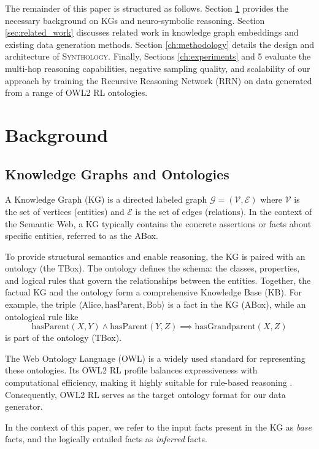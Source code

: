 \documentclass{IOS-Book-Article}     %
\newcommand{\gen}[1]{\langle #1 \rangle}
\begin{document}
The remainder of this paper is structured as follows. Section \ref{sec:background} provides the necessary background on KGs and neuro-symbolic reasoning. Section \ref{sec:related_work} discusses related work in knowledge graph embeddings and existing data generation methods. Section \ref{ch:methodology} details the design and architecture of \textsc{Synthology}. Finally, Sections \ref{ch:experiments} and 5 evaluate the multi-hop reasoning capabilities, negative sampling quality, and scalability of our approach by training the Recursive Reasoning Network (RRN) \cite{hohenecker2020ontology} on data generated from a range of OWL2 RL ontologies.

\section{Background}
\label{sec:background}

\subsection{Knowledge Graphs and Ontologies}
A Knowledge Graph (KG) is a directed labeled graph $\mathcal{G} = (\mathcal{V}, \mathcal{E})$ where $\mathcal{V}$ is the set of vertices (entities) and $\mathcal{E}$ is the set of edges (relations). In the context of the Semantic Web, a KG typically contains the concrete assertions or facts about specific entities, referred to as the ABox.

To provide structural semantics and enable reasoning, the KG is paired with an ontology (the TBox). The ontology defines the schema: the classes, properties, and logical rules that govern the relationships between the entities. Together, the factual KG and the ontology form a comprehensive Knowledge Base (KB). For example, the triple $\gen{\text{Alice}, \text{hasParent}, \text{Bob}}$ is a fact in the KG (ABox), while an ontological rule like
$$\text{hasParent}(X, Y) \land \text{hasParent}(Y, Z) \implies \text{hasGrandparent}(X, Z)$$
is part of the ontology (TBox).

The Web Ontology Language (OWL) is a widely used standard for representing these ontologies. Its OWL2 RL profile balances expressiveness with computational efficiency, making it highly suitable for rule-based reasoning \cite{motik2009owl}. Consequently, OWL2 RL serves as the target ontology format for our data generator.

In the context of this paper, we refer to the input facts present in the KG as \textit{base} facts, and the logically entailed facts as \textit{inferred} facts.
\end{document}
